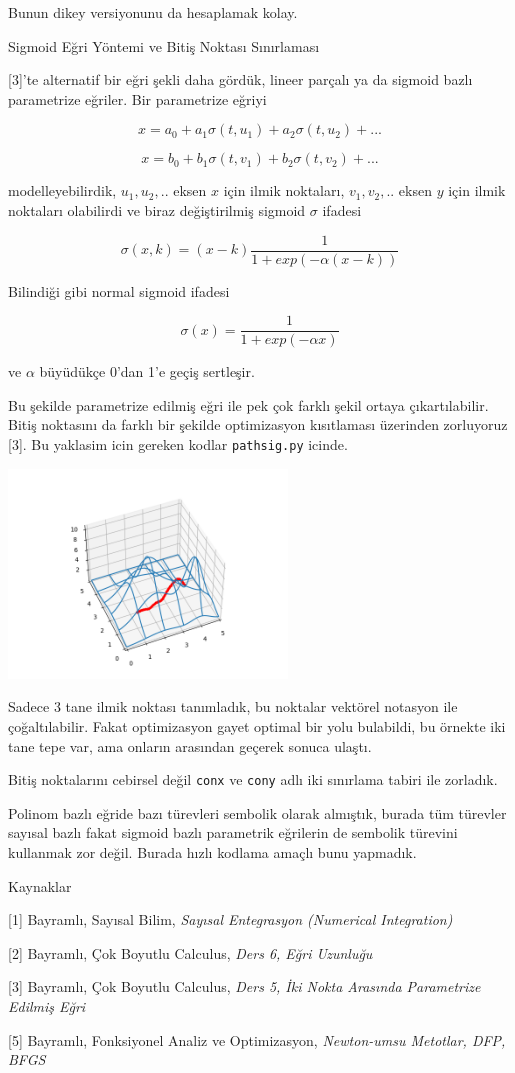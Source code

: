 \documentclass[12pt,fleqn]{article}\usepackage{../../common}
\begin{document}
Bunun dikey versiyonunu da hesaplamak kolay.

Sigmoid Eğri Yöntemi ve Bitiş Noktası Sınırlaması

[3]'te alternatif bir eğri şekli daha gördük, lineer parçalı ya da sigmoid
bazlı parametrize eğriler. Bir parametrize eğriyi 

$$
x = a_0 + a_1 \sigma(t,u_1) + a_2 \sigma(t,u_2) + ... 
$$

$$
x = b_0 + b_1 \sigma(t,v_1) + b_2 \sigma(t,v_2) + ... 
$$

modelleyebilirdik, $u_1,u_2,..$ eksen $x$ için ilmik noktaları,
$v_1,v_2,..$ eksen $y$ için ilmik noktaları olabilirdi ve biraz
değiştirilmiş sigmoid $\sigma$ ifadesi

$$
\sigma (x,k) = (x-k) \frac{1}{1 + exp(-\alpha (x-k))}
$$

Bilindiği gibi normal sigmoid ifadesi

$$
\sigma (x) = \frac{1}{1 + exp(-\alpha x)}
$$

ve $\alpha$ büyüdükçe 0'dan 1'e geçiş sertleşir. 

Bu şekilde parametrize edilmiş eğri ile pek çok farklı şekil ortaya
çıkartılabilir. Bitiş noktasını da farklı bir şekilde optimizasyon kısıtlaması
üzerinden zorluyoruz [3]. Bu yaklasim icin gereken kodlar \verb!pathsig.py!
icinde.

\includegraphics[width=20em]{calc_multi_40_elev_06.png}

Sadece 3 tane ilmik noktası tanımladık, bu noktalar vektörel notasyon ile
çoğaltılabilir. Fakat optimizasyon gayet optimal bir yolu bulabildi, bu
örnekte iki tane tepe var, ama onların arasından geçerek sonuca ulaştı. 

Bitiş noktalarını cebirsel değil \verb!conx! ve \verb!cony! adlı iki
sınırlama tabiri ile zorladık.

Polinom bazlı eğride bazı türevleri sembolik olarak almıştık, burada
tüm türevler sayısal bazlı fakat sigmoid bazlı parametrik eğrilerin de
sembolik türevini kullanmak zor değil. Burada hızlı kodlama amaçlı bunu
yapmadık. 

Kaynaklar 

[1] Bayramlı, Sayısal Bilim, {\em Sayısal Entegrasyon (Numerical Integration)}

[2] Bayramlı, Çok Boyutlu Calculus, {\em Ders 6, Eğri Uzunluğu}

[3] Bayramlı, Çok Boyutlu Calculus, {\em Ders 5, İki Nokta Arasında Parametrize Edilmiş Eğri}

[5] Bayramlı, Fonksiyonel Analiz ve Optimizasyon, {\em Newton-umsu Metotlar, DFP, BFGS }
\end{document}
